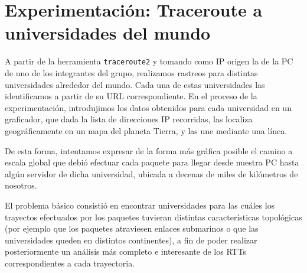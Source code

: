 \documentclass[final,inline,a4paper,narroweqnarray]{ieee}
\let\Oldsection\section
\renewcommand{\section}{\FloatBarrier\Oldsection}
\begin{document}
\section{Experimentación: Traceroute a universidades del mundo}

A partir de la herramienta \texttt{traceroute2} y tomando como IP origen la de la PC de uno de los integrantes del grupo,
realizamos rastreos para distintas universidades alrededor del mundo. Cada una de estas universidades las identificamos
a partir de su URL correspondiente. 
En el proceso de la experimentación, introdujimos los datos obtenidos para cada universidad en un graficador, que 
dada la lista de direcciones IP recorridas, las localiza geográficamente en un mapa del planeta Tierra, 
y las une mediante una línea. 

De esta forma, intentamos expresar de la forma más gráfica posible el camino a 
escala global que debió efectuar cada paquete para llegar desde nuestra PC hasta algún servidor de dicha universidad, 
ubicada a decenas de miles de kilómetros de nosotros. 

El problema básico consistió en encontrar universidades para las cuáles los trayectos efectuados por los paquetes 
tuvieran distintas características topológicas (por ejemplo que los paquetes atraviesen enlaces submarinos o que
las universidades queden en distintos continentes), a fin 
de poder realizar posteriormente un análisis más completo e interesante de los RTTs 
correspondientes a cada trayectoria.  
\end{document}

